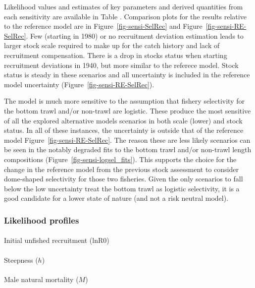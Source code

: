 \documentclass[
]{scrartcl}
\makeatletter
\let\oldparagraph\paragraph
\renewcommand{\paragraph}{
    \@ifstar
      \xxxParagraphStar
      \xxxParagraphNoStar
  }
\newcommand{\xxxParagraphStar}[1]{\oldparagraph*{#1}\mbox{}}
\newcommand{\xxxParagraphNoStar}[1]{\oldparagraph{#1}\mbox{}}
\makeatother
\begin{document}
Likelihood values and estimates of key parameters and derived quantities
from each sensitivity are available in Table . Comparison plots for the
results relative to the reference model are in
Figure~\ref{fig-sensi-SelRec} and Figure~\ref{fig-sensi-RE-SelRec}. Few
(starting in 1980) or no recruitment deviation estimation leads to
larger stock scale required to make up for the catch history and lack of
recruitment compensation. There is a drop in stocks status when starting
recruitment deviations in 1940, but more similar to the referece model.
Stock status is steady in these scenarios and all uncertainty is
included in the reference model uncertainty
(Figure~\ref{fig-sensi-RE-SelRec}).

The model is much more sensitive to the assumption that fishery
selectivity for the bottom trawl and/or non-trawl are logistic. These
produce the most sensitive of all the explored alternative models
scenarios in both scale (lower) and stock status. In all of these
instances, the uncertainty is outside that of the reference model
Figure~\ref{fig-sensi-RE-SelRec}. The reason these are less likely
scenarios can be seen in the notably degraded fits to the bottom trawl
and/or non-trawl length compositions
(Figure~\ref{fig-sensi-logsel_fits}). This supports the choice for the
change in the reference model from the previous stock assessment to
consider dome-shaped selectivity for those two fisheries. Given the only
scenarios to fall below the low uncertainty treat the bottom trawl as
logistic selectivity, it is a good candidate for a lower state of nature
(and not a risk neutral model).

\subsubsection{Likelihood profiles}\label{likelihood-profiles-1}

\paragraph{Initial unfished recruitment
(lnR0)}\label{initial-unfished-recruitment-lnr0}

\paragraph{\texorpdfstring{Steepness
(\(h\))}{Steepness (h)}}\label{steepness-h}

\paragraph{\texorpdfstring{Male natural mortality
(\(M\))}{Male natural mortality (M)}}\label{male-natural-mortality-m}
\end{document}
